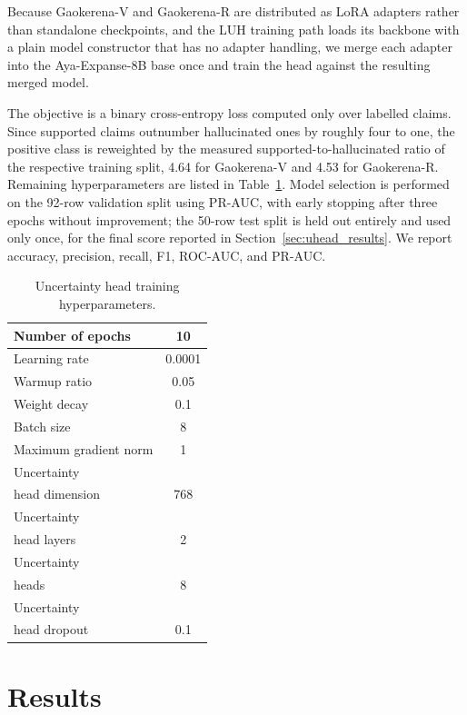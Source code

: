 \documentclass[review]{elsarticle}
\begin{document}
Because Gaokerena-V and Gaokerena-R are distributed as LoRA adapters rather than standalone checkpoints, and the LUH training path loads its backbone with a plain model constructor that has no adapter handling, we merge each adapter into the Aya-Expanse-8B base once and train the head against the resulting merged model.

The objective is a binary cross-entropy loss computed only over labelled claims. Since supported claims outnumber hallucinated ones by roughly four to one, the positive class is reweighted by the measured supported-to-hallucinated ratio of the respective training split, 4.64 for Gaokerena-V and 4.53 for Gaokerena-R. Remaining hyperparameters are listed in Table~\ref{tab:uhead_training}. Model selection is performed on the 92-row validation split using PR-AUC, with early stopping after three epochs without improvement; the 50-row test split is held out entirely and used only once, for the final score reported in Section~\ref{sec:uhead_results}. We report accuracy, precision, recall, F1, ROC-AUC, and PR-AUC.

\begin{table}[ht]
\centering
\begin{tabular}{|l|c|}
\hline
Number of epochs & 10 \\ \hline
Learning rate & 0.0001 \\ \hline
Warmup ratio & 0.05 \\ \hline
Weight decay & 0.1 \\ \hline
Batch size & 8 \\ \hline
Maximum gradient norm & 1 \\ \hline
Uncertainty & \\
head dimension & 768 \\ \hline
Uncertainty & \\
head layers & 2 \\ \hline
Uncertainty & \\
heads & 8 \\ \hline
Uncertainty & \\
head dropout & 0.1 \\ \hline
\end{tabular}
\caption{Uncertainty head training hyperparameters.}
\label{tab:uhead_training}
\end{table}

\section{Results}
\label{sec:results}
\end{document}
